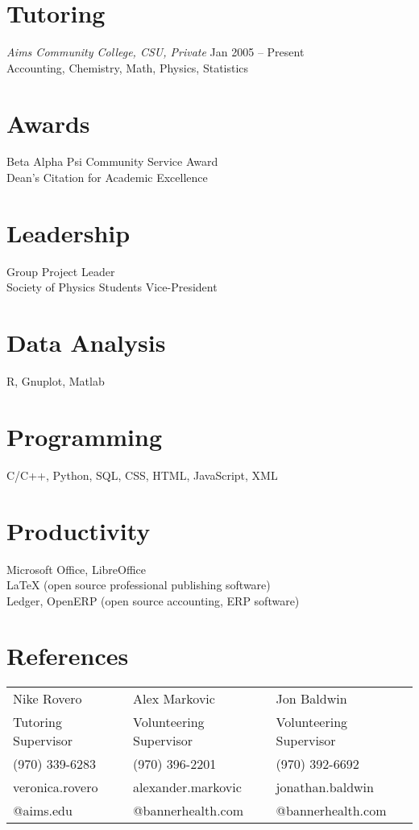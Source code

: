 \documentclass[margin]{res}
\begin{document}
\begin{resume}
\section{Tutoring}
{\sl Aims Community College, CSU, Private} \hfill Jan 2005 -- Present\\
Accounting, Chemistry, Math, Physics, Statistics

\section{Awards}
Beta Alpha Psi Community Service Award\\
Dean's Citation for Academic Excellence

\section{Leadership}
Group Project Leader\\
Society of Physics Students Vice-President

\section{Data Analysis}
R, Gnuplot, Matlab

\section{Programming}
C/C++, Python, SQL, CSS, HTML, JavaScript, XML

\section{Productivity}
Microsoft Office, LibreOffice\\
LaTeX (open source professional publishing software)\\
Ledger, OpenERP (open source accounting, ERP software)

\section{References}
\hskip-0.08in
\begin{tabular}{lll}
Nike Rovero         & Alex Markovic            & Jon Baldwin             \\
Tutoring Supervisor & Volunteering Supervisor  & Volunteering Supervisor \\
(970) 339-6283      & (970) 396-2201           & (970) 392-6692          \\
veronica.rovero     & alexander.markovic       & jonathan.baldwin        \\
@aims.edu           & @bannerhealth.com        & @bannerhealth.com       
\end{tabular}

\end{resume}
\end{document}
